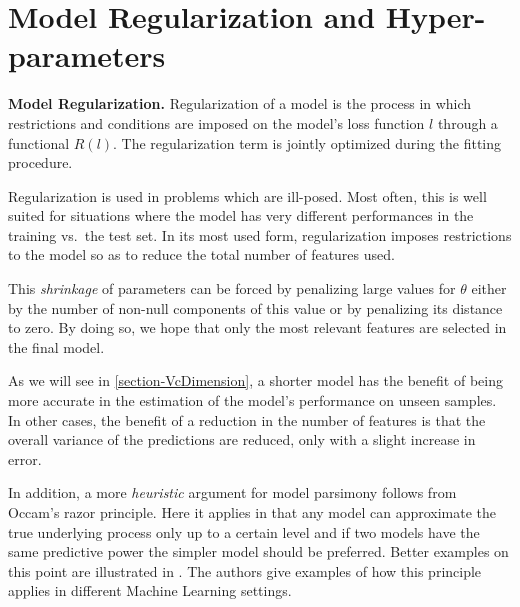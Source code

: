 

\section{Model Regularization and Hyper-parameters}\label{section-hyperParametersRegularization}


\begin{definition}\textbf{Model Regularization.}
Regularization of a model is the process in which restrictions and conditions are imposed on the model's loss function $l$ through a functional $ R(l)$.
The regularization term is jointly optimized during the fitting procedure.
\end{definition}

Regularization is used in problems which are ill-posed.
Most often, this is well suited for situations where the model has very different performances in the training vs.\ the test set.
In its most used form, regularization imposes restrictions to the model so as to reduce the total number of features used.

This \textit{shrinkage} of parameters can be forced by penalizing large values for $\theta$ either by the number of non-null components of this value or by penalizing its distance to zero.
By doing so, we hope that only the most relevant features are selected in the final model.

As we will see in \cref{section-VcDimension}, a shorter model has the benefit of being more accurate in the estimation of the model's performance on unseen samples.
In other cases, the benefit of a reduction in the number of features is that the overall variance of the predictions are reduced, only with a slight increase in error.

In addition, a more \textit{heuristic} argument for model parsimony follows from Occam's razor principle.
Here it applies in that any model can approximate the true underlying process only up to a certain level and if two models have the same predictive power the simpler model should be preferred.
Better examples on this point are illustrated in \citep{rasmussenGhahramani2001occamsRazor}.
The authors give examples  of how this principle applies in different Machine Learning settings.


